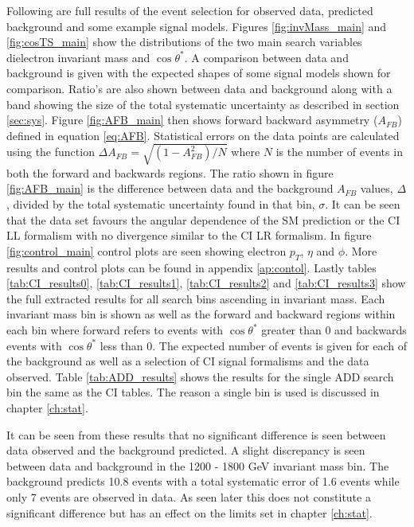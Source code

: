 	Following are full results of the event selection for observed data, predicted background and some example signal models. Figures \ref{fig:invMass_main} and \ref{fig:cosTS_main} show the distributions of the two main search variables dielectron invariant mass and $\cos{\theta^{*}}$. A comparison between data and background is given with the expected shapes of some signal models shown for comparison. Ratio's are also shown between data and background along with a band showing the size of the total systematic uncertainty as described in section \ref{sec:sys}. Figure \ref{fig:AFB_main} then shows forward backward asymmetry ($A_{FB}$) defined in equation \ref{eq:AFB}. Statistical errors on the data points are calculated using the function $\Delta A_{FB} = \sqrt{(1-A_{FB}^{2})/N}$ where $N$ is the number of events in both the forward and backwards regions. The ratio shown in figure \ref{fig:AFB_main} is the difference between data and the background $A_{FB}$ values, $\Delta$, divided by the total systematic uncertainty found in that bin, $\sigma$. It can be seen that the data set favours the angular dependence of the SM prediction or the CI LL formalism with no divergence similar to the CI LR formalism. 
	In figure \ref{fig:control_main} control plots are seen showing electron $p_{T}$, $\eta$ and $\phi$. More results and control plots can be found in appendix \ref{ap:contol}. 
	Lastly tables \ref{tab:CI_results0}, \ref{tab:CI_results1}, \ref{tab:CI_results2} and \ref{tab:CI_results3} show the full extracted results for all search bins ascending in invariant mass. Each invariant mass bin is shown as well as the forward and backward regions within each bin where forward refers to events with $\cos{\theta^{*}}$ greater than 0 and backwards events with $\cos{\theta^{*}}$ less than 0. The expected number of events is given for each of the background as well as a selection of CI signal formalisms and the data observed. Table \ref{tab:ADD_results} shows the results for the single ADD search bin the same as the CI tables. The reason a single bin is used is discussed in chapter \ref{ch:stat}.

	It can be seen from these results that no significant difference is seen between data observed and the background predicted. A slight discrepancy is seen between data and background in the 1200 - 1800 GeV invariant mass bin. The background predicts 10.8 events with a total systematic error of 1.6 events while only 7 events are observed in data. As seen later this does not constitute a significant difference but has an effect on the limits set in chapter \ref{ch:stat}. 



